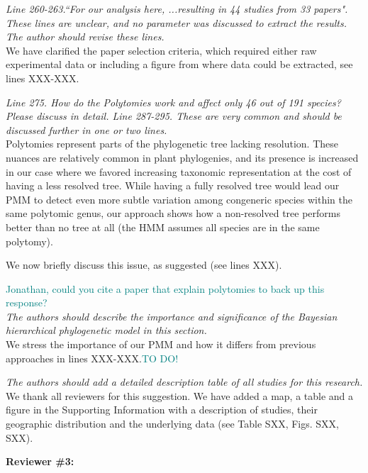 \documentclass[11pt]{article}
\begin{document}
\emph{Line 260-263.``For our analysis here, ...resulting in 44 studies from 33 papers". These lines are unclear, and no parameter was discussed to extract the results. The author should revise these lines.}\\
We have clarified the paper selection criteria, which required either raw experimental data or including a figure from where data could be extracted, see lines XXX-XXX. 

\emph{Line 275. How do the Polytomies work and affect only 46 out of 191 species? Please discuss in detail. Line 287-295. These are very common and should be discussed further in one or two lines.}\\
Polytomies represent parts of the phylogenetic tree lacking resolution. These nuances are relatively common in plant phylogenies, and its presence is increased in our case where we favored increasing taxonomic representation at the cost of having a less resolved tree. While having a fully resolved tree would lead our PMM to detect even more subtle variation among congeneric species within the same polytomic genus, our approach shows how a non-resolved tree performs better than no tree at all (the HMM assumes all species are in the same polytomy). 

We now briefly discuss this issue, as suggested (see lines XXX).

\textcolor{teal}{Jonathan, could you  cite a paper that explain polytomies to back up this response?}\\


\emph{The authors should describe the importance and significance of the Bayesian hierarchical phylogenetic model in this section.}\\
We stress the importance of our PMM and how it differs from previous approaches in lines XXX-XXX.\textcolor{teal}{TO DO!}


\emph{The authors should add a detailed description table of all studies for this research.}\\
We thank all reviewers for this suggestion. We have added a map, a table and a figure in the Supporting Information with a description of studies, their geographic distribution and the underlying data (see Table SXX, Figs. SXX, SXX).



{\bf Reviewer \#3:}\\
\end{document}
